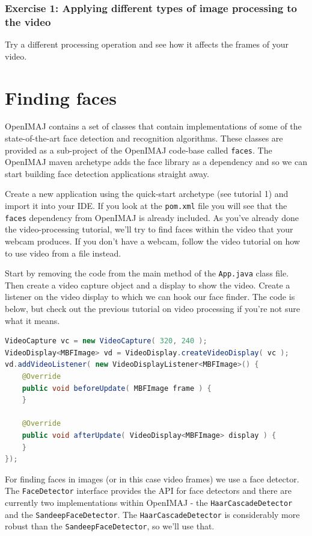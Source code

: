 \documentclass[10pt,a4paper,twoside,extrafontsizes]{memoir}
\begin{document}
\subsection*{Exercise 1: Applying different types of image processing to the video}
Try a different processing operation and see how it affects the frames of your video.

\chapter{Finding faces}
OpenIMAJ contains a set of classes that contain implementations of some of the state-of-the-art face 
detection and recognition algorithms. These classes are provided as a sub-project of the OpenIMAJ 
code-base called \verb+faces+. The OpenIMAJ maven archetype adds the face library as a dependency and 
so we can start building face detection applications straight away.

Create a new application using the quick-start archetype (see tutorial 1) and import it into your IDE. 
If you look at the \verb+pom.xml+ file you will see that the \verb+faces+ dependency from OpenIMAJ is 
already included. As you've already done the video-processing tutorial, we'll try to find faces within 
the video that your webcam produces. If you don't have a webcam, follow the video tutorial on how to 
use video from a file instead.

Start by removing the code from the main method of the \verb+App.java+ class file. Then create a video 
capture object and a display to show the video. Create a listener on the video display to which we can 
hook our face finder. The code is below, but check out the previous tutorial on video processing if 
you're not sure what it means.
\begin{lstlisting}[language=java]
VideoCapture vc = new VideoCapture( 320, 240 );
VideoDisplay<MBFImage> vd = VideoDisplay.createVideoDisplay( vc );
vd.addVideoListener( new VideoDisplayListener<MBFImage>() {
    @Override
    public void beforeUpdate( MBFImage frame ) {
    }

    @Override
    public void afterUpdate( VideoDisplay<MBFImage> display ) {
    }
});
\end{lstlisting}
For finding faces in images (or in this case video frames) we use a face detector. The \verb+FaceDetector+ 
interface provides the API for face detectors and there are currently two implementations within OpenIMAJ - 
the \verb+HaarCascadeDetector+ and the \verb+SandeepFaceDetector+. The \verb+HaarCascadeDetector+
is considerably more robust than the \verb+SandeepFaceDetector+, so we'll use that.
\end{document}

